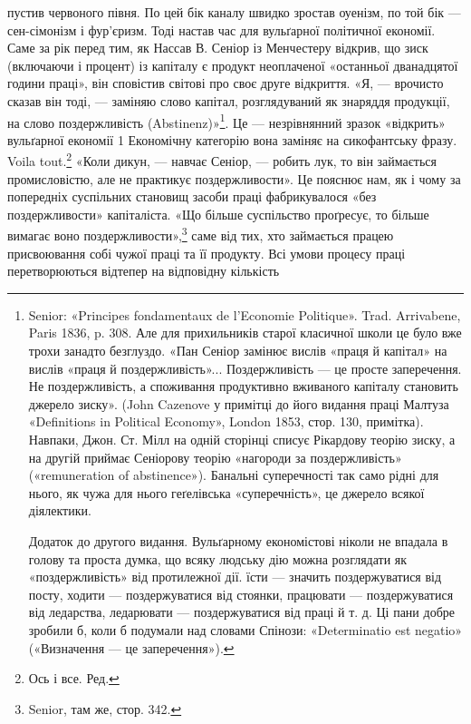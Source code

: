 \parcont{}  %
пустив червоного півня. По цей бік каналу швидко зростав оуенізм,
по той бік — сен-сімонізм і фур'єризм. Тоді настав час
для вульґарної політичної економії. Саме за рік перед тим, як
Нассав В. Сеніор із Менчестеру відкрив, що зиск (включаючи
і процент) із капіталу є продукт неоплаченої «останньої дванадцятої
години праці», він сповістив світові про своє друге відкриття.
«Я, — врочисто сказав він тоді, — заміняю слово капітал,
розглядуваний як знаряддя продукції, на слово поздержливість
(Abstinenz)»\footnote{
Senior: «Principes fondamentaux de l’Economie Politique». Trad.
Arrivabene, Paris 1836, p. 308. Але для прихильників старої класичної
школи це було вже трохи занадто безглуздо. «Пан Сеніор замінює вислів
«праця й капітал» на вислів «праця й поздержливість»... Поздержливість
— це просте заперечення. Не поздержливість, а споживання продуктивно
вживаного капіталу становить джерело зиску». (John Cazenove
у примітці до його видання праці Малтуза «Definitions in Political
Economy», London 1853, стор. 130, примітка). Навпаки, Джон. Ст.
Мілл на одній сторінці списує Рікардову теорію зиску, а на другій приймає
Сеніорову теорію «нагороди за поздержливість» («remuneration
of abstinence»). Банальні суперечності так само рідні для нього, як чужа
для нього геґелівська «суперечність», це джерело всякої діялектики.

Додаток до другого видання. Вульґарному економістові ніколи не
впадала в голову та проста думка, що всяку людську дію можна розглядати
як «поздержливість» від протилежної дії. їсти — значить поздержуватися
від посту, ходити — поздержуватися від стоянки, працювати —
поздержуватися від ледарства, ледарювати — поздержуватися від праці
й т. д. Ці пани добре зробили б, коли б подумали над словами Спінози:
«Determinatio est negatio» («Визначення — це заперечення»).
}. Це — незрівнянний зразок «відкрить» вульґарної
економії 1 Економічну категорію вона заміняє на сикофантську
фразу. Voila tout.\footnote*{
Ось і все. Ред.
} «Коли дикун, — навчає Сеніор, — робить
лук, то він займається промисловістю, але не практикує
поздержливости». Це пояснює нам, як і чому за попередніх суспільних
становищ засоби праці фабрикувалося «без поздержливости»
капіталіста. «Що більше суспільство проґресує, то більше
вимагає воно поздержливости»,\footnote{
Senior, там же, стор. 342.
} саме від тих, хто займається
працею присвоювання собі чужої праці та її продукту. Всі умови
процесу праці перетворюються відтепер на відповідну кількість
